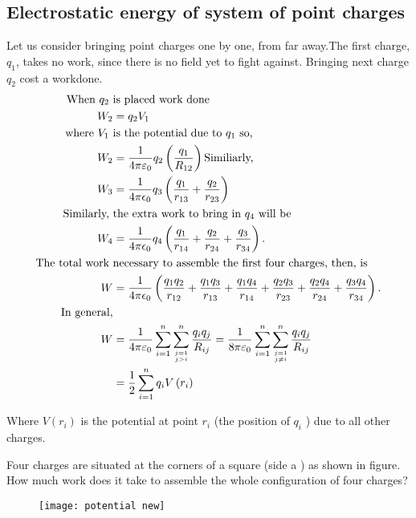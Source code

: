 \subsection{Electrostatic energy of system of point charges}
Let us consider bringing point charges one by one, from far away.The first charge, $q_{1}$, takes no work, since there is no field yet to fight against. Bringing next charge $q_{2}$ cost a workdone. 
\begin{align}
\text{When $q_{2}$ }&\text{is placed work done}\\
W_{2}&=q_{2} V_{1}\\
\text{where $V_{1}$ }&\text{is the potential due to $q_{1}$ so,}\\
W_{2}&=\frac{1}{4 \pi \varepsilon_{0}} q_{2}\left(\frac{q_{1}}{R_{12}}\right)
\text{Similiarly,}\\
W_{3}&=\frac{1}{4 \pi \epsilon_{0}} q_{3}\left(\frac{q_{1}}{r_{13}}+\frac{q_{2}}{r_{23}}\right)\\
\text{Similarly, }&\text{the extra work to bring in $q_{4}$ will be}\\
W_{4}&=\frac{1}{4 \pi \epsilon_{0}} q_{4}\left(\frac{q_{1}}{r_{14}}+\frac{q_{2}}{r_{24}}+\frac{q_{3}}{r_{34}}\right) .\\
\text{The total work }&\text{necessary to assemble the first four charges, then, is}\\
W&=\frac{1}{4 \pi \epsilon_{0}}\left(\frac{q_{1} q_{2}}{r_{12}}+\frac{q_{1} q_{3}}{r_{13}}+\frac{q_{1} q_{4}}{r_{14}}+\frac{q_{2} q_{3}}{r_{23}}+\frac{q_{2} q_{4}}{r_{24}}+\frac{q_{3} q_{4}}{r_{34}}\right) .\\
\text{In general,}\\
W&=\frac{1}{4 \pi \varepsilon_{0}} \sum_{i=1}^{n} \sum_{j=1 \atop j>i}^{n} \frac{q_{i} q_{j}}{R_{i j}}=\frac{1}{8 \pi \varepsilon_{0}} \sum_{i=1}^{n} \sum_{j=1 \atop j \neq i}^{n} \frac{q_{i} q_{j}}{R_{i j}}\\
&=\frac{1}{2} \sum_{i=1}^{n} q_{i} V\left(r_{i}\right)\label{electrostatics energy
}
\end{align}
\begin{center}
\end{center}
Where $V\left(r_{i}\right)$ is the potential at point $r_{i}$ (the position of $q_{i}$ ) due to all other charges.
\begin{exercise}
	Four charges are situated at the corners of a square (side a ) as shown in figure. How much work does it take to assemble the whole configuration of four charges?
	\begin{figure}[H]
		\centering
		\texttt{[image: potential new]}
	\end{figure}
\end{exercise}
